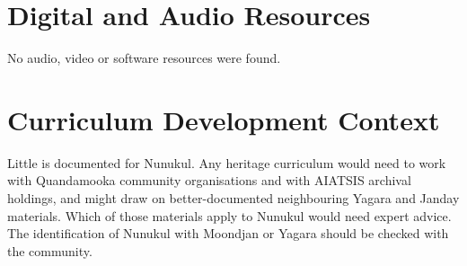 \documentclass[12pt]{article}
\begin{document}
\section{Digital and Audio Resources}
No audio, video or software resources were found.

\section{Curriculum Development Context}
Little is documented for Nunukul. Any heritage curriculum would need to work with Quandamooka community organisations and with AIATSIS archival holdings, and might draw on better-documented neighbouring Yagara and Janday materials. Which of those materials apply to Nunukul would need expert advice. The identification of Nunukul with Moondjan or Yagara should be checked with the community.
\end{document}
